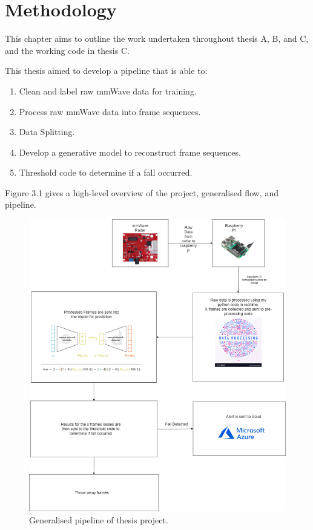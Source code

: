 \chapter{Methodology}\label{ch:style}

This chapter aims to outline the work undertaken throughout thesis A, B, and C, and the working code in thesis C.

This thesis aimed to develop a pipeline that is able to:
\begin{enumerate}
    \item Clean and label raw mmWave data for training.
    \item Process raw mmWave data into frame sequences.
    \item Data Splitting.
    \item Develop a generative model to reconstruct frame sequences.
    \item Threshold code to determine if a fall occurred. 
\end{enumerate}

Figure 3.1 gives a high-level overview of the project, generalised flow, and pipeline.

\begin{figure}[H]
    \centering
    \includegraphics[width=425px,keepaspectratio=true]{tech.png}
    \caption{Generalised pipeline of thesis project.}
    \label{fig:my_label}
\end{figure}

